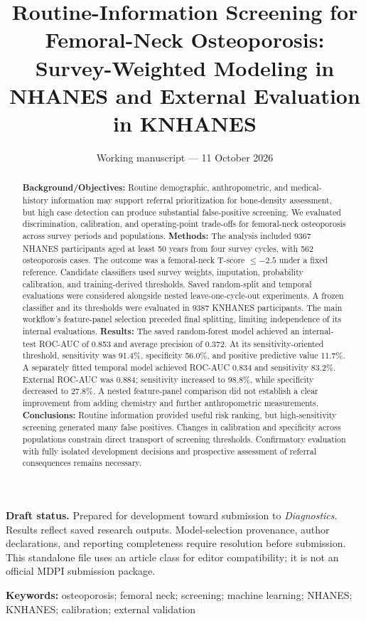 \documentclass[11pt,a4paper]{article}
\title{Routine-Information Screening for Femoral-Neck Osteoporosis: Survey-Weighted Modeling in NHANES and External Evaluation in KNHANES}
\author{\pending{Author names, affiliations, ORCIDs, and corresponding author}}
\date{Working manuscript --- 11 October 2026}
\begin{document}
\maketitle
\noindent\textbf{Draft status.} Prepared for development toward submission to \emph{Diagnostics}. Results reflect saved research outputs. Model-selection provenance, author declarations, and reporting completeness require resolution before submission. This standalone file uses an article class for editor compatibility; it is not an official MDPI submission package.

\begin{abstract}
\noindent\textbf{Background/Objectives:} Routine demographic, anthropometric, and medical-history information may support referral prioritization for bone-density assessment, but high case detection can produce substantial false-positive screening. We evaluated discrimination, calibration, and operating-point trade-offs for femoral-neck osteoporosis across survey periods and populations.
\textbf{Methods:} The analysis included 9367 NHANES participants aged at least 50 years from four survey cycles, with 562 osteoporosis cases. The outcome was a femoral-neck T-score $\leq-2.5$ under a fixed reference. Candidate classifiers used survey weights, imputation, probability calibration, and training-derived thresholds. Saved random-split and temporal evaluations were considered alongside nested leave-one-cycle-out experiments. A frozen classifier and its thresholds were evaluated in 9387 KNHANES participants. The main workflow's feature-panel selection preceded final splitting, limiting independence of its internal evaluations.
\textbf{Results:} The saved random-forest model achieved an internal-test ROC-AUC of 0.853 and average precision of 0.372. At its sensitivity-oriented threshold, sensitivity was 91.4\%, specificity 56.0\%, and positive predictive value 11.7\%. A separately fitted temporal model achieved ROC-AUC 0.834 and sensitivity 83.2\%. External ROC-AUC was 0.884; sensitivity increased to 98.8\%, while specificity decreased to 27.8\%. A nested feature-panel comparison did not establish a clear improvement from adding chemistry and further anthropometric measurements.
\textbf{Conclusions:} Routine information provided useful risk ranking, but high-sensitivity screening generated many false positives. Changes in calibration and specificity across populations constrain direct transport of screening thresholds. Confirmatory evaluation with fully isolated development decisions and prospective assessment of referral consequences remains necessary.
\end{abstract}
\noindent\textbf{Keywords:} osteoporosis; femoral neck; screening; machine learning; NHANES; KNHANES; calibration; external validation
\end{document}
